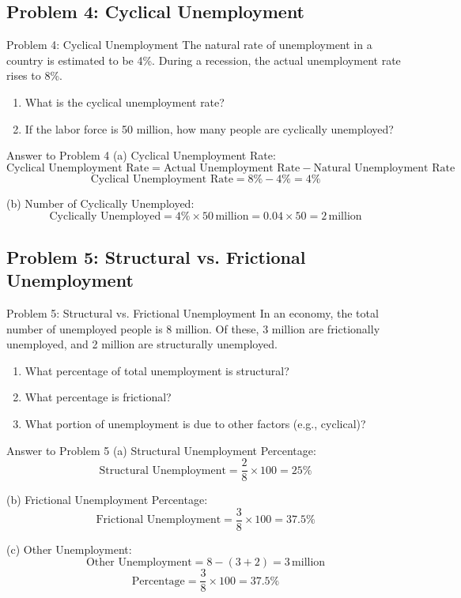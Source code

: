 \documentclass{beamer}
\begin{document}
\subsection{Problem 4: Cyclical Unemployment}
\begin{frame}{Problem 4: Cyclical Unemployment}
The natural rate of unemployment in a country is estimated to be 4\%. During a recession, the actual unemployment rate rises to 8\%.
\begin{enumerate}
    \item What is the cyclical unemployment rate?  
    \item If the labor force is 50 million, how many people are cyclically unemployed?  
\end{enumerate}
\end{frame}

\begin{frame}{Answer to Problem 4}
(a) Cyclical Unemployment Rate:
\[
\text{Cyclical Unemployment Rate} = \text{Actual Unemployment Rate} - \text{Natural Unemployment Rate}
\]
\[
\text{Cyclical Unemployment Rate} = 8\% - 4\% = 4\%
\]

(b) Number of Cyclically Unemployed:
\[
\text{Cyclically Unemployed} = 4\% \times 50 \, \text{million} = 0.04 \times 50 = 2 \, \text{million}
\]
\end{frame}

\subsection{Problem 5: Structural vs. Frictional Unemployment}
\begin{frame}{Problem 5: Structural vs. Frictional Unemployment}
In an economy, the total number of unemployed people is 8 million. Of these, 3 million are frictionally unemployed, and 2 million are structurally unemployed.
\begin{enumerate}
    \item What percentage of total unemployment is structural?  
    \item What percentage is frictional?  
    \item What portion of unemployment is due to other factors (e.g., cyclical)?  
\end{enumerate}
\end{frame}

\begin{frame}{Answer to Problem 5}
(a) Structural Unemployment Percentage:
\[
\text{Structural Unemployment} = \frac{2}{8} \times 100 = 25\%
\]

(b) Frictional Unemployment Percentage:
\[
\text{Frictional Unemployment} = \frac{3}{8} \times 100 = 37.5\%
\]

(c) Other Unemployment:
\[
\text{Other Unemployment} = 8 - (3 + 2) = 3 \, \text{million}
\]
\[
\text{Percentage} = \frac{3}{8} \times 100 = 37.5\%
\]
\end{frame}
\end{document}
